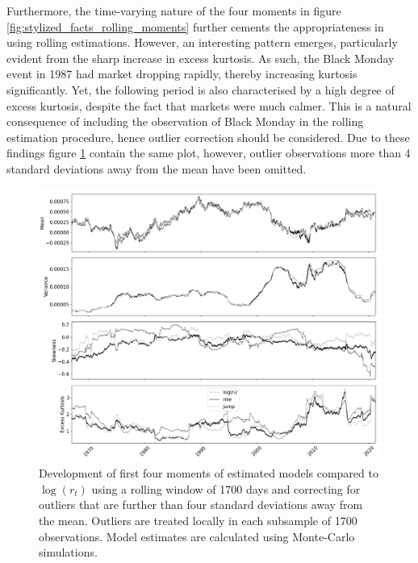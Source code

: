 Furthermore, the time-varying nature of the four moments in figure \ref{fig:stylized_facts_rolling_moments} further cements the appropriateness in using rolling estimations. However, an interesting pattern emerges, particularly evident from the sharp increase in excess kurtosis. As such, the Black Monday event in 1987 had market dropping rapidly, thereby increasing kurtosis significantly. Yet, the following period is also characterised by a high degree of excess kurtosis, despite the fact that markets were much calmer. This is a natural consequence of including the observation of Black Monday in the rolling estimation procedure, hence outlier correction should be considered. Due to these findings figure \ref{fig:stylized_facts_rolling_moments_outliers} contain the same plot, however, outlier observations more than 4 standard deviations away from the mean have been omitted. 

\begin{figure}[H] 
    \centering
    \includegraphics[width=1.0\textwidth]{analysis/stylized_facts/images/rolling_moments_outlier_corrected.png}
    \caption{Development of first four moments of estimated models compared to $\log(r_t)$ using a rolling window of 1700 days and correcting for outliers that are further than four standard deviations away from the mean. Outliers are treated locally in each subsample of 1700 observations. Model estimates are calculated using Monte-Carlo simulations.}
    \label{fig:stylized_facts_rolling_moments_outliers} 
\end{figure}

